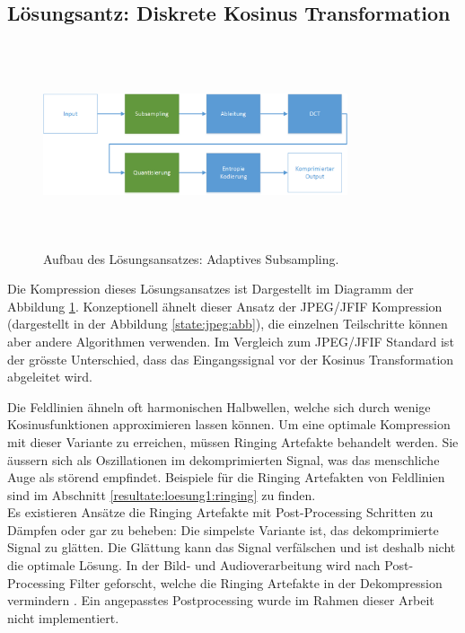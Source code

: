 \subsection{Lösungsantz: Diskrete Kosinus Transformation}\label{konzept:loesung1}
\begin{figure}[!htbp]
	\center
	\includegraphics[width=0.8\textwidth,height=6cm,keepaspectratio]{./pictures/konzept/solution1/aufbau.png}
	\caption{Aufbau des Lösungsansatzes: Adaptives Subsampling.}
	\label{konzept:loesung1:aufbau}
\end{figure} 
Die Kompression dieses Lösungsansatzes ist Dargestellt im Diagramm der Abbildung \ref{konzept:loesung1:aufbau}. Konzeptionell ähnelt dieser Ansatz der JPEG/JFIF Kompression (dargestellt in der Abbildung \ref{state:jpeg:abb}), die einzelnen Teilschritte können aber andere Algorithmen verwenden. Im Vergleich zum JPEG/JFIF Standard ist der grösste Unterschied, dass das Eingangssignal vor der Kosinus Transformation abgeleitet wird.

Die Feldlinien ähneln oft harmonischen Halbwellen, welche sich durch wenige Kosinusfunktionen approximieren lassen können. Um eine optimale Kompression mit dieser Variante zu erreichen, müssen Ringing Artefakte \cite{wiki:ringing:artefacts} behandelt werden. Sie äussern sich als Oszillationen im dekomprimierten Signal, was das menschliche Auge als störend empfindet. Beispiele für die Ringing Artefakten von Feldlinien sind im Abschnitt \ref{resultate:loesung1:ringing} zu finden.\\
Es existieren Ansätze die Ringing Artefakte mit Post-Processing Schritten zu Dämpfen oder gar zu beheben: Die simpelste Variante ist, das dekomprimierte Signal zu glätten. Die Glättung kann das Signal verfälschen und ist deshalb nicht die optimale Lösung. In der Bild- und Audioverarbeitung wird nach Post-Processing Filter geforscht, welche die Ringing Artefakte in der Dekompression vermindern \cite{kaup1998reduction} \cite{park1999postprocessing}. Ein angepasstes Postprocessing wurde im Rahmen dieser Arbeit nicht implementiert.

